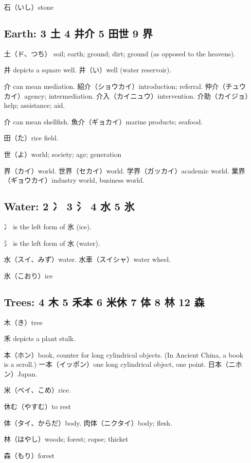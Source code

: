 石（いし）stone

\subsection{Earth: 3 土 4 井介 5 田世 9 界}

土（ド、つち）
soil; earth; ground; dirt; ground (as opposed to the heavens).

井 depicts a square well.
井（い）well (water reservoir).

介 can mean mediation.
紹介（ショウカイ）introduction; referral.
仲介（チュウカイ）agency; intermediation.
介入（カイニュウ）intervention.
介助（カイジョ）help; assistance; aid.

介 can mean shellfish.
魚介（ギョカイ）marine products; seafood.

田（た）rice field.

世（よ）world; society; age; generation

界（カイ）world.
世界（セカイ）world.
学界（ガッカイ）academic world.
業界（ギョウカイ）industry world, business world.

\subsection{Water: 2 冫 3 氵 4 水 5 氷}

冫 is the left form of 氷 (ice).

氵 is the left form of 水 (water).

水（スイ、みず）water.
水車（スイシャ）water wheel.

氷（こおり）ice

\subsection{Trees: 4 木 5 禾本 6 米休 7 体 8 林 12 森}

木（き）tree

禾 depicts a plant stalk.

本（ホン）book, counter for long cylindrical objects.
(In Ancient China, a book is a scroll.)
一本（イッポン）one long cylindrical object, one point.
日本（ニホン）Japan.

米（ベイ、こめ）rice.

休む（やすむ）to rest

体（タイ、からだ）body.
肉体（ニクタイ）body; flesh.

林（はやし）woods; forest; copse; thicket

森（もり）forest

